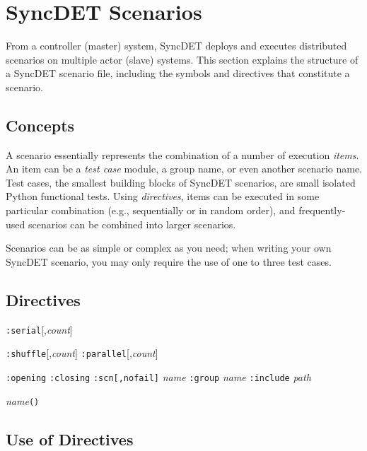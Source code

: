 \section{SyncDET Scenarios}

From a controller (master) system, SyncDET deploys and executes distributed
scenarios on multiple actor (slave) systems. This section explains the structure
of a SyncDET scenario file, including the symbols and directives that constitute
a scenario.

\subsection{Concepts}
A scenario essentially represents the combination of a number of execution {\em
items}. An item can be a {\em test case} module, a group name, or even another
scenario name. Test cases, the smallest building blocks of SyncDET scenarios,
are small isolated Python functional tests. Using
{\em directives}, items can be executed in some particular combination (e.g.,
sequentially or in random order), and frequently-used scenarios can be combined
into larger scenarios.

Scenarios can be as simple or complex as you need; when writing your own SyncDET
scenario, you may only require the use of one to three test cases.

\subsection{Directives}
{\tt :serial}[,{\it count}]

{\tt :shuffle}[,{\it count}]
{\tt :parallel}[,{\it count}]

{\tt :opening}
{\tt :closing}
{\tt :scn[,nofail]} {\it name}
{\tt :group} {\it name}
{\tt :include} {\it path}

{\it name}{\tt ()}

\subsection{Use of Directives}
